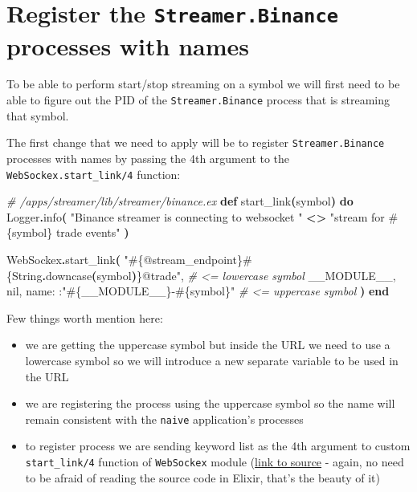 \documentclass[
  oneside]{book}
\newenvironment{Shaded}{\begin{snugshade}}{\end{snugshade}}
\newcommand{\CommentTok}[1]{\textcolor[rgb]{0.56,0.35,0.01}{\textit{#1}}}
\newcommand{\ConstantTok}[1]{\textcolor[rgb]{0.56,0.35,0.01}{#1}}
\newcommand{\FunctionTok}[1]{\textcolor[rgb]{0.13,0.29,0.53}{\textbf{#1}}}
\newcommand{\KeywordTok}[1]{\textcolor[rgb]{0.13,0.29,0.53}{\textbf{#1}}}
\newcommand{\NormalTok}[1]{#1}
\newcommand{\OperatorTok}[1]{\textcolor[rgb]{0.81,0.36,0.00}{\textbf{#1}}}
\newcommand{\OtherTok}[1]{\textcolor[rgb]{0.56,0.35,0.01}{#1}}
\newcommand{\StringTok}[1]{\textcolor[rgb]{0.31,0.60,0.02}{#1}}
\newcommand{\VariableTok}[1]{\textcolor[rgb]{0.00,0.00,0.00}{#1}}
\providecommand{\tightlist}{%
  \setlength{\itemsep}{0pt}\setlength{\parskip}{0pt}}
\begin{document}
\section{\texorpdfstring{Register the \texttt{Streamer.Binance} processes with names}{Register the Streamer.Binance processes with names}}\label{register-the-streamer.binance-processes-with-names}

To be able to perform start/stop streaming on a symbol we will first need to be able to figure out the PID of the \texttt{Streamer.Binance} process that is streaming that symbol.

The first change that we need to apply will be to register \texttt{Streamer.Binance} processes with names by passing the 4th argument to the \texttt{WebSockex.start\_link/4} function:

\begin{Shaded}
\begin{Highlighting}[]
  \CommentTok{\# /apps/streamer/lib/streamer/binance.ex}
  \KeywordTok{def}\NormalTok{ start\_link}\FunctionTok{(}\NormalTok{symbol}\FunctionTok{)} \KeywordTok{do}
    \ConstantTok{Logger}\OperatorTok{.}\NormalTok{info}\FunctionTok{(}
      \StringTok{"Binance streamer is connecting to websocket "} \OperatorTok{\textless{}\textgreater{}}
        \StringTok{"stream for }\OtherTok{\#\{}\NormalTok{symbol}\OtherTok{\}}\StringTok{ trade events"}
    \FunctionTok{)}

    \ConstantTok{WebSockex}\OperatorTok{.}\NormalTok{start\_link}\FunctionTok{(}
      \StringTok{"}\OtherTok{\#\{@stream\_endpoint\}\#\{}\ConstantTok{String}\OperatorTok{.}\NormalTok{downcase}\FunctionTok{(}\NormalTok{symbol}\FunctionTok{)}\OtherTok{\}}\StringTok{@trade"}\NormalTok{, }\CommentTok{\# \textless{}= lowercase symbol}
      \ConstantTok{\_\_MODULE\_\_}\NormalTok{,}
      \ConstantTok{nil}\NormalTok{,}
      \VariableTok{name:}\NormalTok{ :}\StringTok{"}\OtherTok{\#\{}\ConstantTok{\_\_MODULE\_\_}\OtherTok{\}}\StringTok{{-}}\OtherTok{\#\{}\NormalTok{symbol}\OtherTok{\}}\StringTok{"} \CommentTok{\# \textless{}= uppercase symbol}
    \FunctionTok{)}
  \KeywordTok{end}
\end{Highlighting}
\end{Shaded}

Few things worth mention here:

\begin{itemize}
\tightlist
\item
  we are getting the uppercase symbol but inside the URL we need to use a lowercase symbol so we will introduce a new separate variable to be used in the URL
\item
  we are registering the process using the uppercase symbol so the name will remain consistent with the \texttt{naive} application's processes
\item
  to register process we are sending keyword list as the 4th argument to custom \texttt{start\_link/4} function of \texttt{WebSockex} module (\href{https://github.com/Azolo/websockex/blob/master/lib/websockex.ex\#L376}{link to source} - again, no need to be afraid of reading the source code in Elixir, that's the beauty of it)
\end{itemize}
\end{document}
